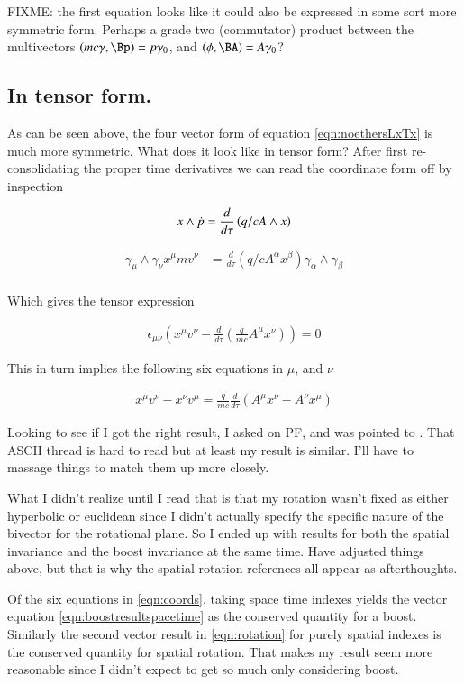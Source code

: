 \documentclass{article}      %
\begin{document}
FIXME: the first equation looks like it could also be expressed in some sort more symmetric form.  Perhaps a grade two (commutator) product between the multivectors $(mc\gamma, \Bp) = p \gamma_0$, and $(\phi, \BA) = A \gamma_0$?

\subsection{ In tensor form. }

As can be seen above, the four vector form of equation \ref{eqn:noethersLxTx} is much more symmetric.  What does it look like in 
tensor form?  After first re-consolidating the proper time derivatives we can read the coordinate form off by inspection

\begin{align*}
x \wedge \dot{p} &= \frac{d}{d\tau} \left( q/c A \wedge x \right) \\
\end{align*}

\begin{align*}
\gamma_\mu \wedge \gamma_\nu x^\mu m v^\nu &= \frac{d}{d\tau} \left( q/c A^\alpha x^\beta \right) \gamma_\alpha \wedge \gamma_\beta \\
\end{align*}

Which gives the tensor expression

\begin{align}
\epsilon_{\mu\nu} \left(x^\mu v^\nu - \frac{d}{d\tau} \left( \frac{q}{mc} A^\mu x^\nu \right) \right) = 0
\end{align}

This in turn implies the following six equations in $\mu$, and $\nu$

\begin{align}\label{eqn:coords}
x^\mu v^\nu - x^\nu v^\mu = \frac{q}{mc} \frac{d}{d\tau} \left( A^\mu x^\nu - A^\nu x^\mu \right)
\end{align}

Looking to see if I got the right result, I asked on PF, and was pointed to 
\cite{BaezBoosts}.
That ASCII thread is hard to read but at least my result is similar.  I'll have to massage things to match them up more closely.

What I didn't realize until I read that is that my rotation wasn't fixed as either hyperbolic or euclidean since I didn't actually specify the specific nature of the bivector for the rotational plane.  So I ended up with results for both the spatial invariance and the boost invariance at the same time.  Have adjusted things above, but that is why the spatial rotation references all appear as afterthoughts.

Of the six equations in \ref{eqn:coords}, taking space time indexes 
yields the vector equation \ref{eqn:boostresultspacetime} as the conserved quantity for a boost.  Similarly
the second vector result in \ref{eqn:rotation} for purely spatial indexes is the conserved quantity for spatial rotation.
That makes my result seem more reasonable since I didn't expect to get so much only considering boost.

\end{document}
